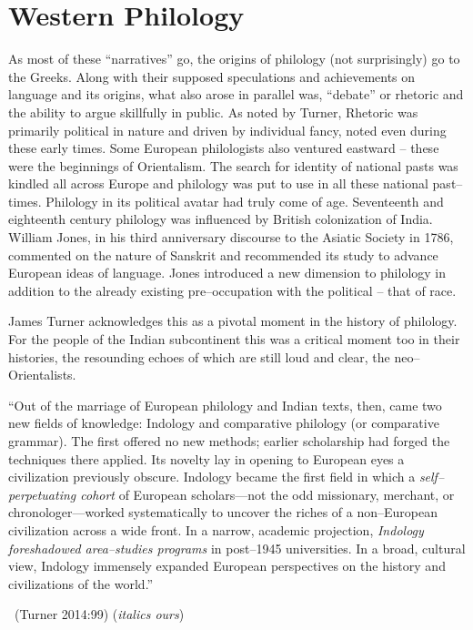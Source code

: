 \section*{Western Philology}

As most of these “narratives” go, the origins of philology (not surprisingly) go to the Greeks. Along with their supposed speculations and achievements on language and its origins, what also arose in parallel was, “debate” or rhetoric and the ability to argue skillfully in public. As noted by Turner, Rhetoric was primarily political in nature and driven by individual fancy, noted even during these early times. Some European philologists also ventured eastward – these were the beginnings of Orientalism. The search for identity of national pasts was kindled all across Europe and philology was put to use in all these national past–times. Philology in its political avatar had truly come of age. Seventeenth and eighteenth century philology was influenced by British colonization of India. William Jones, in his third anniversary discourse to the Asiatic Society in 1786, commented on the nature of Sanskrit and recommended its study to advance European ideas of language. Jones introduced a new dimension to philology in addition to the already existing pre–occupation with the political – that of race.

James Turner acknowledges this as a pivotal moment in the history of philology. For the people of the Indian subcontinent this was a critical moment too in their histories, the resounding echoes of which are still loud and clear, the neo–Orientalists.

\begin{myquote}
“Out of the marriage of European philology and Indian texts, then, came two new fields of knowledge: Indology and comparative philology (or comparative grammar). The first offered no new methods; earlier scholarship had forged the techniques there applied. Its novelty lay in opening to European eyes a civilization previously obscure. Indology became the first field in which a \textit{self–perpetuating cohort} of European scholars—not the odd missionary, merchant, or chronologer—worked systematically to uncover the riches of a non–European civilization across a wide front. In a narrow, academic projection, \textit{Indology foreshadowed area–studies programs} in post–1945 universities. In a broad, cultural view, Indology immensely expanded European perspectives on the history and civilizations of the world.” 

~\hfill (Turner 2014:99) (\textit{italics ours})
\end{myquote}

